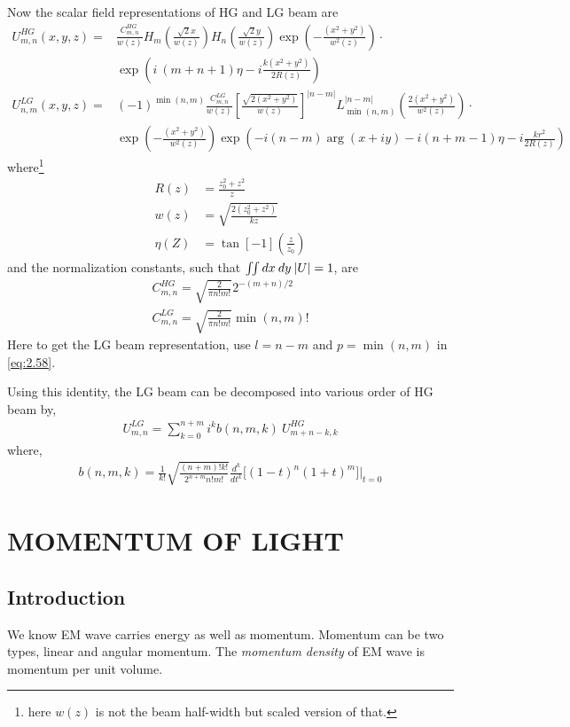 \documentclass[11pt,a4paper]{article}
\numberwithin{equation}{section}
\begin{document}
Now the scalar field representations of HG and LG beam are 
\begin{align}
	U_{m,n}^{HG}(x,y,z)=& \frac{C_{m,n}^{HG}}{w(z)} H_m\left(\frac{\sqrt{2} x}{w(z)}\right) H_n\left(\frac{\sqrt{2} y}{w(z)}\right)\exp( -\frac{(x^2+y^2)}{w^2(z)}) \cdot\nonumber\\ 
	&\exp( i\:(m+n+1)\eta -i\frac{k(x^2+y^2)}{2R(z)}) \\
	U_{n,m}^{LG}(x,y,z)=&(-1)^{\min(n,m)}\frac{C_{m,n}^{LG}}{w(z)} \left[\frac{\sqrt{2(x^2+y^2)}}{w(z)}\right]^{|n-m|} L_{\min(n,m)}^{|n-m|}\left(\frac{2(x^2+y^2)}{w^2(z)}\right)\cdot\nonumber\\&\exp(-\frac{(x^2+y^2)}{w^2(z)}) \exp(-i(n-m)\arg(x+iy)-i(n+m-1)\eta-i\frac{kr^2}{2R(z)}) 
\end{align}
where\footnote{here $w(z)$ is not the beam half-width but scaled version of that.}
\begin{align}
	R(z)&= \frac{z_0^2+z^2}{z}\\
	w(z)&= \sqrt{\frac{2(z_0^2+z^2)}{kz}}\\
	\eta(Z)&= \tan[-1](\frac{z}{z_0})
\end{align}
and the normalization constants, such that $\iint dx\:dy\: \abs{U}=1$, are
\begin{align}
	C_{m,n}^{HG}=\sqrt{\frac{2}{\pi n!m!}}2^{-(m+n)/2}\\
	C_{m,n}^{LG}=\sqrt{\frac{2}{\pi n!m!}}\min(n,m)!
\end{align}
Here to get the LG beam representation, use $l=n-m$ and $p=\min(n,m)$ in \ref{eq:2.58}.

Using this identity, the LG beam can be decomposed into various order of HG beam by, \cite{beijers allen 93}
\begin{align}
	U_{m,n}^{LG}= \sum_{k=0}^{n+m}i^k b(n,m,k)\: U_{m+n-k,k}^{HG}
\end{align}
where,
\begin{align}
	b(n,m,k)=\frac{1}{k!}\sqrt{\frac{(n+m)!k!}{2^{n+m}n!m!}} \frac{d^k}{dt^k}\big[(1-t)^n(1+t)^m \big] \bigg|_{t=0}
\end{align}
\clearpage


\section{MOMENTUM OF LIGHT}
\subsection{Introduction}
We know EM wave carries energy as well as momentum. Momentum can be two types, linear and angular momentum. The \textit{momentum density} of EM wave is momentum per unit volume.
\end{document}
